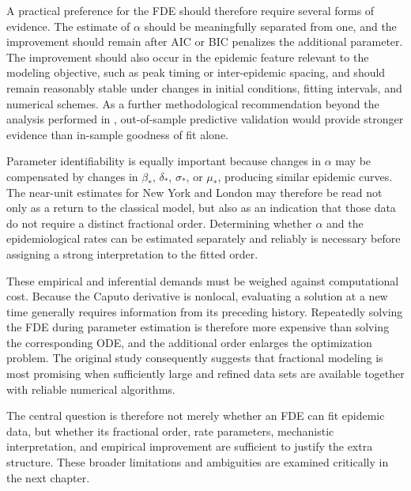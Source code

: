 \documentclass[00-main.tex]{subfiles}
\begin{document}
A practical preference for the FDE should therefore require several forms of evidence.
The estimate of $\alpha$ should be meaningfully separated from one, and the improvement should remain after AIC or BIC penalizes the additional parameter.
The improvement should also occur in the epidemic feature relevant to the modeling objective, such as peak timing or inter-epidemic spacing, and should remain reasonably stable under changes in initial conditions, fitting intervals, and numerical schemes.
As a further methodological recommendation beyond the analysis performed in \cite{Is20}, out-of-sample predictive validation would provide stronger evidence than in-sample goodness of fit alone.

Parameter identifiability is equally important because changes in $\alpha$ may be compensated by changes in $\beta_*$, $\delta_*$, $\sigma_*$, or $\mu_*$, producing similar epidemic curves.
The near-unit estimates for New York and London may therefore be read not only as a return to the classical model, but also as an indication that those data do not require a distinct fractional order.
Determining whether $\alpha$ and the epidemiological rates can be estimated separately and reliably is necessary before assigning a strong interpretation to the fitted order.

These empirical and inferential demands must be weighed against computational cost.
Because the Caputo derivative is nonlocal, evaluating a solution at a new time generally requires information from its preceding history.
Repeatedly solving the FDE during parameter estimation is therefore more expensive than solving the corresponding ODE, and the additional order enlarges the optimization problem.
The original study consequently suggests that fractional modeling is most promising when sufficiently large and refined data sets are available together with reliable numerical algorithms.

The central question is therefore not merely whether an FDE can fit epidemic data, but whether its fractional order, rate parameters, mechanistic interpretation, and empirical improvement are sufficient to justify the extra structure.
These broader limitations and ambiguities are examined critically in the next chapter.

\ifSubfilesClassLoaded{\printbibliography}{}
\end{document}
